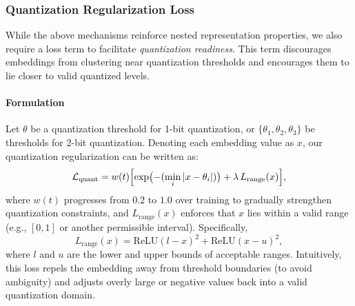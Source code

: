 \subsubsection{Quantization Regularization Loss}
\label{subsubsec:quant_reg}
While the above mechanisms reinforce nested representation properties, we also require a loss term to facilitate \emph{quantization readiness}. This term discourages embeddings from clustering near quantization thresholds and encourages them to lie closer to valid quantized levels.

\paragraph{Formulation}
Let $\theta$ be a quantization threshold for 1-bit quantization, or $\{\theta_1, \theta_2, \theta_3\}$ be thresholds for 2-bit quantization. Denoting each embedding value as $x$, our quantization regularization can be written as:
\begin{equation}
    \mathcal{L}_{\text{quant}} 
    = 
    w(t) 
    \Bigl[
        \exp\bigl(-(\min_i |x - \theta_i|)\bigr) 
        + 
        \lambda\,L_{\text{range}}(x)
    \Bigr],
\end{equation}
where $w(t)$ progresses from $0.2$ to $1.0$ over training to gradually strengthen quantization constraints, and $L_{\text{range}}(x)$ enforces that $x$ lies within a valid range (e.g., $[0,1]$ or another permissible interval). Specifically,
\begin{equation}
    L_{\text{range}}(x) 
    = 
    \text{ReLU}(l - x)^2 
    + 
    \text{ReLU}(x - u)^2,
\end{equation}
where $l$ and $u$ are the lower and upper bounds of acceptable ranges. Intuitively, this loss repels the embedding away from threshold boundaries (to avoid ambiguity) and adjusts overly large or negative values back into a valid quantization domain.



